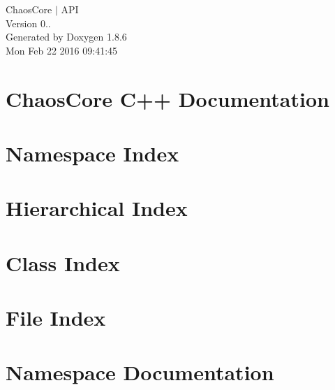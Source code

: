 \documentclass[twoside]{book}
\newcommand{\clearemptydoublepage}{%
  \newpage{\pagestyle{empty}\cleardoublepage}%
}
\begin{document}
\hypersetup{pageanchor=false}
\begin{titlepage}
\vspace*{7cm}
\begin{center}%
{\Large Chaos\-Core $\vert$ A\-P\-I \\[1ex]\large Version 0.. }\\
\vspace*{1cm}
{\large Generated by Doxygen 1.8.6}\\
\vspace*{0.5cm}
{\small Mon Feb 22 2016 09:41:45}\\
\end{center}
\end{titlepage}
\clearemptydoublepage
\tableofcontents
\clearemptydoublepage
{}
\hypersetup{pageanchor=true}

\chapter{Chaos\-Core C++ Documentation}
\label{index}\hypertarget{index}{}
\chapter{Namespace Index}

\chapter{Hierarchical Index}

\chapter{Class Index}

\chapter{File Index}

\chapter{Namespace Documentation}












\end{document}
